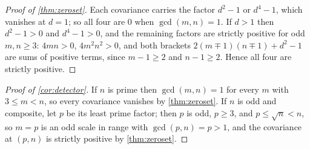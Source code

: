 \documentclass[11pt]{amsart}
\theoremstyle{definition}
\theoremstyle{remark}
\begin{document}
\begin{proof}[Proof of \cref{thm:zeroset}]
Each covariance carries the factor $d^2-1$ or $d^4-1$, which vanishes at $d=1$; so all four are $0$ when $\gcd(m,n)=1$. If $d>1$ then $d^2-1>0$ and $d^4-1>0$, and the remaining factors are strictly positive for odd $m,n\ge3$: $4mn>0$, $4m^2n^2>0$, and both brackets $2(m\mp1)(n\mp1)+d^2-1$ are sums of positive terms, since $m-1\ge2$ and $n-1\ge2$. Hence all four are strictly positive.
\end{proof}

\begin{proof}[Proof of \cref{cor:detector}]
If $n$ is prime then $\gcd(m,n)=1$ for every $m$ with $3\le m<n$, so every covariance vanishes by \cref{thm:zeroset}. If $n$ is odd and composite, let $p$ be its least prime factor; then $p$ is odd, $p\ge3$, and $p\le\sqrt n<n$, so $m=p$ is an odd scale in range with $\gcd(p,n)=p>1$, and the covariance at $(p,n)$ is strictly positive by \cref{thm:zeroset}.
\end{proof}
\end{document}
